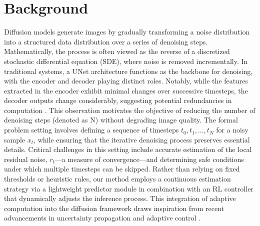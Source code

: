 \documentclass{article} %
\begin{document}
\section{Background}
\label{sec:background}
Diffusion models generate images by gradually transforming a noise distribution into a structured data distribution over a series of denoising steps. Mathematically, the process is often viewed as the reverse of a discretized stochastic differential equation (SDE), where noise is removed incrementally. In traditional systems, a UNet architecture functions as the backbone for denoising, with the encoder and decoder playing distinct roles. Notably, while the features extracted in the encoder exhibit minimal changes over successive timesteps, the decoder outputs change considerably, suggesting potential redundancies in computation \cite{li2023faster}. This observation motivates the objective of reducing the number of denoising steps (denoted as N) without degrading image quality. The formal problem setting involves defining a sequence of timesteps \(t_0, t_1, \ldots, t_N\) for a noisy sample \(x_t\), while ensuring that the iterative denoising process preserves essential details. Critical challenges in this setting include accurate estimation of the local residual noise, \(r_t\)—a measure of convergence—and determining safe conditions under which multiple timesteps can be skipped. Rather than relying on fixed thresholds or heuristic rules, our method employs a continuous estimation strategy via a lightweight predictor module in combination with an RL controller that dynamically adjusts the inference process. This integration of adaptive computation into the diffusion framework draws inspiration from recent advancements in uncertainty propagation and adaptive control \cite{wang2022accelerating}.
\end{document}
